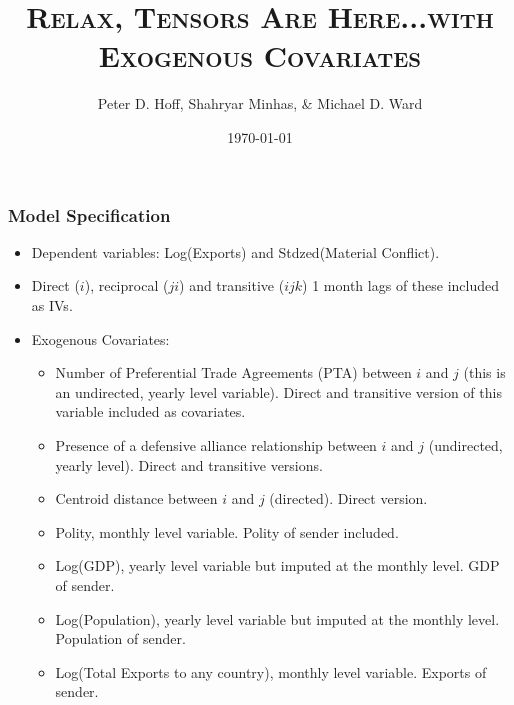 \documentclass[10pt, compress]{beamer}
\title[Tensors]{\textsc{Relax, Tensors Are Here...with Exogenous Covariates}}
\author[Hoff, Minhas, \& Ward]{Peter D. Hoff, Shahryar Minhas, \& Michael D. Ward}
\date{\today}
\begin{document}
\frame{\titlepage}

\frame
{
  \frametitle{Model Specification}
  \vspace{-5mm}
  \begin{itemize}
  \item Dependent variables: Log(Exports) and Stdzed(Material Conflict). 
  \item Direct ($i$), reciprocal ($ji$) and transitive ($ijk$) 1 month lags of these included as IVs.
  \item Exogenous Covariates:
    \begin{itemize}
    \item Number of Preferential Trade Agreements (PTA) between $i$ and $j$ (this is an undirected, yearly level variable). Direct and transitive version of this variable included as covariates.
    \item Presence of a defensive alliance relationship between $i$ and $j$ (undirected, yearly level). Direct and transitive versions.
    \item Centroid distance between $i$ and $j$ (directed). Direct version.
    \item Polity, monthly level variable. Polity of sender included.
    \item Log(GDP), yearly level variable but imputed at the monthly level. GDP of sender.
    \item Log(Population), yearly level variable but imputed at the monthly level. Population of sender.
    \item Log(Total Exports to any country), monthly level variable. Exports of sender.
    \end{itemize}
  \end{itemize}    
} 
\end{document}
